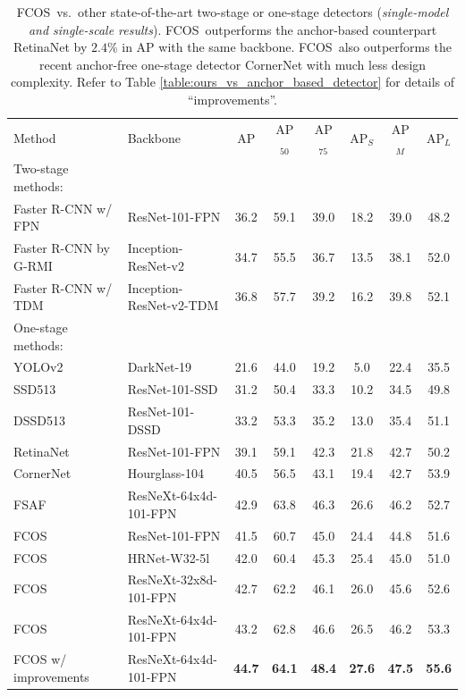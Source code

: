 \documentclass[10pt,twocolumn,letterpaper]{article}
\newcommand{\1}{{\mathbbm{1}}}           %
\def\Ours{{FCNDet}\xspace}
\def\Ours{{FCOS}\xspace}
\begin{document}
\begin{table}[!htb]
%
\centering 
\small
\begin{tabular}{ l | l |c c c | c c c }
Method & Backbone & AP & AP$_{50}$ & AP$_{75}$ & AP$_{S}$ & AP$_{M}$ & AP$_{L}$ \\
\Xhline{2\arrayrulewidth}
\hspace{-0.25cm}\textrm{Two-stage methods:} &&&&&&& \\
%
Faster R-CNN w/ FPN \cite{lin2017feature} & ResNet-101-FPN & 36.2 & 59.1 & 39.0 & 18.2 & 39.0 & 48.2 \\
Faster R-CNN by G-RMI \cite{huang2017speed} & Inception-ResNet-v2 \cite{szegedy2017inception} & 34.7 & 55.5 & 36.7 & 13.5 & 38.1 & 52.0 \\
Faster R-CNN w/ TDM \cite{shrivastava2016beyond} & Inception-ResNet-v2-TDM & 36.8 & 57.7 & 39.2 & 16.2 & 39.8 & 52.1 \\
\hline
\hspace{-0.25cm}\textrm{One-stage methods:} &&&&&&& \\
YOLOv2 \cite{redmon2017yolo9000} & DarkNet-19 \cite{redmon2017yolo9000} & 21.6 & 44.0 & 19.2 & 5.0 & 22.4 & 35.5 \\
SSD513 \cite{liu2016ssd} & ResNet-101-SSD & 31.2 & 50.4 & 33.3 & 10.2 & 34.5 & 49.8 \\
DSSD513 \cite{fu2017dssd} & ResNet-101-DSSD & 33.2 & 53.3 & 35.2 & 13.0 & 35.4 & 51.1 \\
RetinaNet \cite{lin2017focal} & ResNet-101-FPN & 39.1 & 59.1 & 42.3 & 21.8 & 42.7 & 50.2 \\
CornerNet \cite{law2018cornernet} & Hourglass-104 & 40.5 & 56.5 & 43.1 & 19.4 & 42.7 & 53.9 \\
FSAF \cite{zhu2019feature} & ResNeXt-64x4d-101-FPN & 42.9 & 63.8 & 46.3 & 26.6 & 46.2 & 52.7 \\
\hline
\Ours & ResNet-101-FPN & 41.5 & 60.7 & 45.0 & 24.4 & 44.8 & 51.6 \\
\Ours & HRNet-W32-5l \cite{DBLP:journals/corr/abs-1902-09212} & 42.0 & 60.4 & 45.3 & 25.4 & 45.0 & 51.0 \\
\Ours & ResNeXt-32x8d-101-FPN & 42.7 & 62.2 & 46.1 & 26.0 & 45.6 & 52.6 \\
\Ours & ResNeXt-64x4d-101-FPN & 43.2 & 62.8 & 46.6 & 26.5 & 46.2 & 53.3 \\
\hline
FCOS w/ improvements & ResNeXt-64x4d-101-FPN & \textbf{44.7} & \textbf{64.1} & \textbf{48.4} & \textbf{27.6} & \textbf{47.5} & \textbf{55.6} \\
\end{tabular}
%
%
\caption{\Ours\ vs.\ other state-of-the-art two-stage or one-stage detectors (\emph{single-model and single-scale results}). \Ours\ outperforms the anchor-based counterpart RetinaNet by $2.4\%$ in AP with the same backbone. \Ours\ also outperforms  the recent anchor-free one-stage detector CornerNet with much less design complexity. Refer to Table \ref{table:ours_vs_anchor_based_detector} for details of ``improvements''.}

\label{table:ours_vs_stoa_detectors}
\vspace{-0.5cm}
\end{table}
\end{document}
